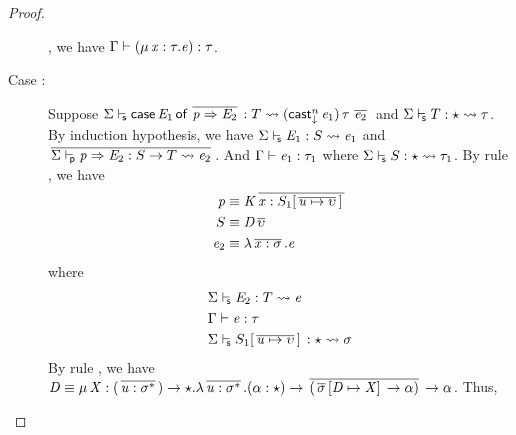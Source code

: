 \begin{proof}
\begin{description}
, we have $\Gamma  \vdash  (  \mu \, \mathit{x}  :  \tau  .  \mathit{e}  )  :  \tau$.
        \item[Case \ruleref{TR\_Case}:] Suppose $ \Sigma  \vdash_{\!\!\mathsf{s} }  \mathsf{case} \, \mathit{E_{{\mathrm{1}}}} \, \mathsf{of} \, \,\overline{  \mathit{p}  \Rightarrow  \mathit{E_{{\mathrm{2}}}}  }\,  :  T   \rightsquigarrow   (  \mathsf{cast}_{\downarrow}^n \, \mathit{e_{{\mathrm{1}}}}  ) \, \tau \, \,\overline{  \mathit{e_{{\mathrm{2}}}}  }\, $ and $ \Sigma  \vdash_{\!\!\mathsf{s} }  T  :  \star   \rightsquigarrow   \tau $. By induction
hypothesis, we have $ \Sigma  \vdash_{\!\!\mathsf{s} }  \mathit{E_{{\mathrm{1}}}}  :  S   \rightsquigarrow   \mathit{e_{{\mathrm{1}}}} $ and $\,\overline{   \Sigma  \vdash_{\!\!\mathsf{p} }  \mathit{p}   \Rightarrow   \mathit{E_{{\mathrm{2}}}}  :  S   \rightarrow   T   \rightsquigarrow   \mathit{e_{{\mathrm{2}}}}   }\,$. And $\Gamma  \vdash  \mathit{e_{{\mathrm{1}}}}  :  \tau_{{\mathrm{1}}}$ where $ \Sigma  \vdash_{\!\!\mathsf{s} }  S  :  \star   \rightsquigarrow   \tau_{{\mathrm{1}}} $. By rule
, we have
        \begin{align*}
            \mathit{p} & \equiv  \mathit{K}  \,\overline{  \mathit{x}  :  S_{{\mathrm{1}}}  [  \,\overline{  \mathit{u}  \mapsto  \upsilon  }\,  ] \,  }\, \\
            S & \equiv  \mathit{D}    \,\overline{  \upsilon  }\, \\
            \mathit{e_{{\mathrm{2}}}} & \equiv  \lambda  \,\overline{  \mathit{x}  :  \sigma  }\,  .  \mathit{e}
        \end{align*}
        where
        \begin{align*}
            & \Sigma  \vdash_{\!\!\mathsf{s} }  \mathit{E_{{\mathrm{2}}}}  :  T   \rightsquigarrow   \mathit{e}  \\
            &\Gamma  \vdash  \mathit{e}  :  \tau \\
            & \Sigma  \vdash_{\!\!\mathsf{s} }  S_{{\mathrm{1}}}  [  \,\overline{  \mathit{u}  \mapsto  \upsilon  }\,  ] \,  :  \star   \rightsquigarrow   \sigma 
        \end{align*}
        By rule , we have $\mathit{D}  \equiv  \mu \, \mathit{X}  :  (  \,\overline{  \mathit{u}  :  \sigma  ^{*}  }\,  )  \rightarrow  \star  .  \lambda  \,\overline{  \mathit{u}  :  \sigma  ^{*}  }\,  .  (  \alpha  :  \star  )  \rightarrow  \,\overline{  (  \,\overline{  \sigma  }\,  [  \mathit{D}  \mapsto  \mathit{X}  ] \,  \rightarrow  \alpha  )  }\,  \rightarrow  \alpha$. Thus,

\end{description}
\end{proof}
